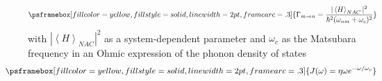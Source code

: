 \documentclass[12pt]{article}
\newcommand{\exv}[1]{\left\langle #1 \right\rangle}
\begin{document}
{\begin{minipage}[c][27cm]{19cm}
\begin{itemize}
\begin{displaymath}
 \psframebox[fillcolor=yellow, fillstyle=solid, linewidth=2pt, framearc=.3]{
     \Gamma_{m\rightarrow n} = \frac{|\exv{H}_{NAC}|^2}{\hbar^2 (\omega_{nm} + \omega_c)^2}
     }
\end{displaymath}
with $|\exv{H}_{NAC}|^2$ as a system-dependent parameter and $\omega_c$ as the Matsubara frequency in an Ohmic expression of the phonon density of states \\
    \vspace{-0.3cm}
\begin{displaymath}
\hspace{-1cm}
 \psframebox[fillcolor=yellow, fillstyle=solid, linewidth=2pt, framearc=.3]{
     J (\omega) = \eta \omega e^{-\omega/\omega_c}
     }
\end{displaymath}
\end{itemize}
\vspace{1cm}
\end{minipage} }
\vspace{3cm}
\end{document}
